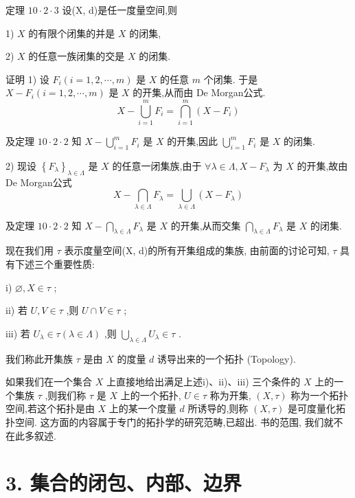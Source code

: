 定理 ${10} \cdot  2 \cdot  3$ 设(X, d)是任一度量空间,则

1) $X$ 的有限个闭集的并是 $X$ 的闭集,

2) $X$ 的任意一族闭集的交是 $X$ 的闭集.

证明 1) 设 ${F}_{i}\left( {i = 1,2,\cdots ,m}\right)$ 是 $X$ 的任意 $m$ 个闭集. 于是 $X - {F}_{i}\left( {i = 1,2,\cdots ,m}\right)$ 是 $X$ 的开集,从而由 De Morgan公式.
$$X - \mathop{\bigcup }\limits_{{i = 1}}^{m}{F}_{i} = \mathop{\bigcap }\limits_{{i = 1}}^{m}\left( {X - {F}_{i}}\right)$$

及定理 ${10} \cdot  2 \cdot  2$ 知 $X - \mathop{\bigcup }\limits_{{i = 1}}^{m}{F}_{i}$ 是 $X$ 的开集,因此 $\mathop{\bigcup }\limits_{{i = 1}}^{m}{F}_{i}$ 是 $X$ 的闭集.

2) 现设 ${\left\{  {F}_{\lambda }\right\}  }_{\lambda  \in  \Lambda }$ 是 $X$ 的任意一闭集族,由于 $\forall \lambda  \in  \Lambda ,X - {F}_{\lambda }$ 为 $X$ 的开集,故由 De Morgan公式
$$X - \mathop{\bigcap }\limits_{{\lambda  \in  \Lambda }}{F}_{\lambda } = \mathop{\bigcup }\limits_{{\lambda  \in  \Lambda }}\left( {X - {F}_{\lambda }}\right)$$

及定理 ${10} \cdot  2 \cdot  2$ 知 $X - \mathop{\bigcap }\limits_{{\lambda  \in  \Lambda }}{F}_{\lambda }$ 是 $X$ 的开集,从而交集 $\mathop{\bigcap }\limits_{{\lambda  \in  \Lambda }}{F}_{\lambda }$ 是 $X$ 的闭集.

现在我们用 $\tau$ 表示度量空间(X, d)的所有开集组成的集族, 由前面的讨论可知, $\tau$ 具有下述三个重要性质:

i) $\varnothing ,X \in  \tau$ ;

ii) 若 $U,V \in  \tau$ ,则 $U \cap  V \in  \tau$ ;

iii) 若 ${U}_{\lambda } \in  \tau \left( {\lambda  \in  \Lambda }\right)$ ,则 $\mathop{\bigcup }\limits_{{\lambda  \in  \Lambda }}{U}_{\lambda } \in  \tau$ .

我们称此开集族 $\tau$ 是由 $X$ 的度量 $d$ 诱导出来的一个拓扑 (Topology).

如果我们在一个集合 $X$ 上直接地给出满足上述i)、ii)、iii) 三个条件的 $X$ 上的一个集族 $\tau$ ,则我们称 $\tau$ 是 $X$ 上的一个拓扑, $U \in  \tau$ 称为开集, $\left( {X,\tau }\right)$ 称为一个拓扑空间,若这个拓扑是由 $X$ 上的某一个度量 $d$ 所诱导的,则称 $\left( {X,\tau }\right)$ 是可度量化拓扑空间. 这方面的内容属于专门的拓扑学的研究范畴,已超出. 书的范围, 我们就不在此多叙述.

\section*{3. 集合的闭包、内部、边界}

